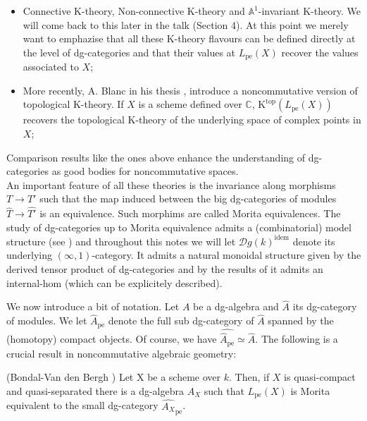 \begin{refsection}
\begin{itemize}
\item Connective K-theory, Non-connective K-theory and $\mathbb{A}^1$-invariant K-theory. We will come back to this later in the talk (Section 4). At this point we merely want to emphazise that all these K-theory flavours can be defined directly at the level of dg-categories and that their values at $L_\mathrm{pe}(X)$ recover the values associated to $X$;

\item More recently, A. Blanc in his thesis \cite{Anthony-thesis}, introduce a noncommutative version of topological K-theory. If $X$ is a scheme defined over $\mathbb{C}$, $\mathrm{K}^{\mathrm{top}}(L_\mathrm{pe}(X))$ recovers the topological K-theory of the underlying space of complex points in $X$;
\end{itemize}

Comparison results like the ones above enhance the understanding of dg-categories as good bodies for noncommutative spaces.\\

An important feature of all these theories is the invariance along morphisms $T\to T'$ such that the map induced between the big dg-categories of modules $\widehat{T}\to \widehat{T'}$ is an equivalence. Such morphims are called Morita equivalences. The study of dg-categories up to Morita equivalence admits a (combinatorial) model structure (see \cite{tabuada-quillen}) and throughout this notes we will let $\mathcal{D}g(k)^\mathrm{idem}$ denote its underlying $(\infty,1)$-category. It admits a natural monoidal structure given by the derived tensor product of dg-categories and by the results of \cite{toen} it admits an internal-hom (which can be explicitely described).


We now introduce a bit of notation. Let $A$ be a dg-algebra and $\widehat{A}$ its dg-category of modules. We let $\widehat{A}_{\mathrm{pe}}$ denote the full sub dg-category of $\widehat{A}$ spanned by the (homotopy) compact objects. Of course, we have $\widehat{\widehat{A}_{\mathrm{pe}}} \simeq \widehat{A}$.  The following is a crucial result in noncommutative algebraic geometry:

\begin{thm}(Bondal-Van den Bergh \cite{bondal-vandenbergh})
Let X be a scheme over $k$. Then, if $X$ is quasi-compact and quasi-separated there is a dg-algebra $A_X$ such that $L_\mathrm{pe}(X)$ is Morita equivalent to the small dg-category $\widehat{A_X}_\mathrm{pe}$.
\end{thm}


\end{refsection}
